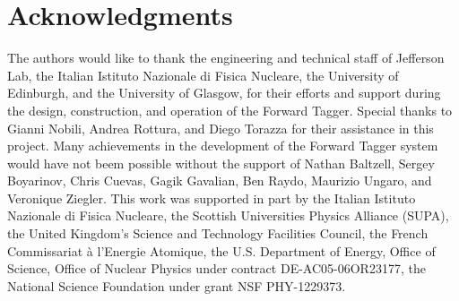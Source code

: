 \section*{Acknowledgments}

The authors would like to thank the engineering and technical staff of Jefferson Lab, the Italian Istituto
Nazionale di Fisica Nucleare, the University of Edinburgh, and the University of Glasgow, for their efforts
and support during the design, construction, and operation of the Forward Tagger. Special thanks to Gianni Nobili,
Andrea Rottura, and Diego Torazza for their assistance in this project. Many achievements in the development of the Forward
Tagger system would have not beem possible without the support of Nathan Baltzell, Sergey Boyarinov, Chris Cuevas,
Gagik Gavalian, Ben Raydo, Maurizio Ungaro, and Veronique Ziegler. This work was supported in part by the Italian
Istituto Nazionale di Fisica Nucleare, the Scottish Universities Physics Alliance (SUPA), the United Kingdom's Science
and Technology Facilities Council, the French Commissariat \`{a} l'Energie Atomique, the U.S. Department of Energy,
Office of Science, Office of Nuclear Physics under contract DE-AC05-06OR23177, the National Science Foundation
under grant NSF PHY-1229373.
